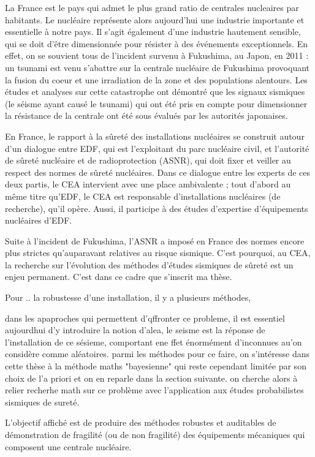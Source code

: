 \documentclass[a4paper]{book}
\begin{document}
La France est le pays qui admet le plus grand ratio de centrales nucleaires par habitants. Le nucléaire représente alors aujourd'hui une industrie importante et essentielle à notre pays. Il s'agit également d'une industrie hautement sensible, qui se doit d'être dimensionnée pour résister à des événements exceptionnels. En effet, on se souvient tous de l'incident survenu à Fukushima, au Japon, en 2011 : un tsunami est venu s'abattre sur la centrale nucléaire de Fukushima provoquant la fusion du coeur et une irradiation de la zone et des populations alentours. Les études et analyses sur cette catastrophe ont démontré que les signaux sismiques (le séisme ayant causé le tsunami) qui ont été pris en compte pour dimensionner la résistance de la centrale ont été sous évalués par les autorités japonaises. 

En France, le rapport à la sûreté des installations nucléaires se construit autour d'un dialogue entre EDF, qui est l'exploitant du parc nucléaire civil, et l'autorité de sûreté nucléaire et de radioprotection (ASNR), qui doit fixer et veiller au respect des normes de sûreté nucléaires. Dans ce dialogue entre les experts de ces deux partis, le CEA intervient avec une place ambivalente ; tout d'abord au même titre qu'EDF, le CEA est responsable d'installations nucléaires (de recherche), qu'il opère. Aussi, il participe à des études d'expertise d'équipements nucléaires d'EDF. 

Suite à l'incident de Fukushima, l'ASNR a imposé en France des normes encore plus strictes qu'auparavant relatives au risque sismique. C'est pourquoi, au CEA, la recherche sur l'évolution des méthodes d'études sismiques de sûreté est un enjeu permanent. C'est dans ce cadre que s'inscrit ma thèse.

Pour .. la robustesse d'une installation, il y a plusieurs méthodes, 

dans les apaproches qui permettent d'qffronter ce probleme, il est essentiel aujourdhui d'y introduire la notion d'alea, le seisme est la réponse de l'installation de ce sésieme, comportant ene ffet énormément d'inconnues au'on considère comme aléatoires. parmi les méthodes pour ce faire, on s'intéresse dans cette thèse à la méthode maths "bayesienne" qui reste cependant limitée par son choix de l'a priori et on en reparle dans la section suivante. 
on cherche alors à relier recherhe math sur ce problème avec l'application aux études probabilistes sismiques de sureté. 

L'objectif affiché est de produire des méthodes robustes et auditables de démonstration de fragilité (ou de non fragilité) des équipements mécaniques qui composent une centrale nucléaire. 
\end{document}
